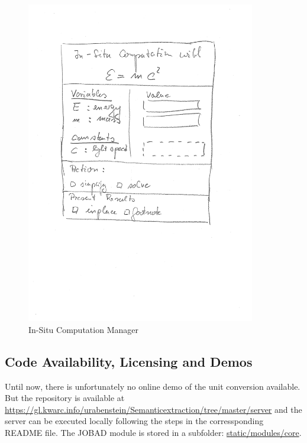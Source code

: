   \begin{figure}[ht]\centering
    \includegraphics[width=10cm]{compman}
    \caption{In-Situ Computation Manager}\label{fig:compman}
  \end{figure}

\subsection{Code Availability, Licensing and Demos}  

Until now, there is unfortunately no online demo of the unit conversion available.  But
the repository is available at
\url{https://gl.kwarc.info/urabenstein/Semanticextraction/tree/master/server} and the
server can be executed locally following the steps in the corressponding README file.  The
JOBAD module is stored in a subfolder: \url{static/modules/core}.

  
